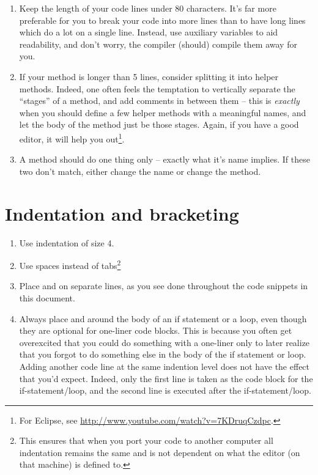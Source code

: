 \begin{enumerate}

\item Keep the length of your code lines under 80 characters. It's far more
preferable for you to break your code into more lines than to have long lines
which do a lot on a single line. Instead, use auxiliary variables to aid
readability, and don't worry, the compiler (should) compile them away for you.

\item If your method is longer than 5 lines, consider splitting it into helper
methods. Indeed, one often feels the temptation to vertically separate the
``stages'' of a method, and add comments in between them -- this is
\emph{exactly} when you should define a few helper methods with a meaningful
names, and let the body of the method just be those stages. Again, if you have
a good editor, it will help you out\footnote{For Eclipse, see
\url{http://www.youtube.com/watch?v=7KDruqCzdpc}.}. 

\item A method should do one thing only -- exactly what it's name implies. If
these two don't match, either change the name or change the method.

\end{enumerate}

\section{Indentation and bracketing}

\begin{enumerate}

\item Use indentation of size 4.

\item Use spaces instead of tabs\footnote{This ensures that when you port your
code to another computer all indentation remains the same and is not dependent
on what the editor (on that machine) is defined to.}

\item Place \mono{\{} and \mono{\}} on separate lines, as you see done
throughout the code snippets in this document.

\item Always place \mono{\{} and \mono{\}} around the body of an if statement
or a loop, even though they are optional for one-liner code blocks. This is
because you often get overexcited that you could do something with a one-liner
only to later realize that you forgot to do something else in the body of the
if statement or loop. Adding another code line at the same indention level does
not have the effect that you'd expect. Indeed, only the first line is taken as
the code block for the if-statement/loop, and the second line is executed after
the if-statement/loop.

\end{enumerate}

